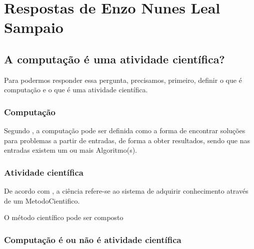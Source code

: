 \section{Respostas de Enzo Nunes Leal Sampaio}

\subsection{A computação é uma atividade científica?}
Para podermos responder essa pergunta, precisamos, primeiro, definir o que é computação e o que é uma atividade científica.

\subsubsection{Computação}
Segundo \citet{wikipedia_computacao_2022}, a computação pode ser definida como a forma de encontrar soluções para problemas a partir de entradas, de forma a obter resultados, sendo que nas entradas existem um ou mais \gls{Algoritmo}(s).

\subsubsection{Atividade científica}
De acordo com \citet{wikipedia_ciencia_2022}, a ciência refere-se ao sistema de adquirir conhecimento através de um \gls{MetodoCientifico}.

O método científico pode ser composto 

\subsubsection{Computação é ou não é atividade científica}

